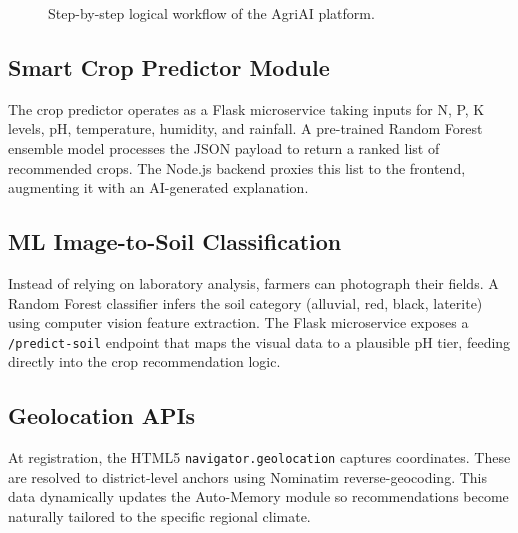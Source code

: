 \documentclass[conference]{IEEEtran}
\begin{document}
\begin{figure}[htbp]
\centering
{}
\caption{Step-by-step logical workflow of the AgriAI platform.}
\label{fig:arch}
\end{figure}

\subsection{Smart Crop Predictor Module}
The crop predictor operates as a Flask microservice taking inputs for N, P, K levels, pH, temperature, humidity, and rainfall. A pre-trained Random Forest ensemble model processes the JSON payload to return a ranked list of recommended crops. The Node.js backend proxies this list to the frontend, augmenting it with an AI-generated explanation.

\subsection{ML Image-to-Soil Classification}
Instead of relying on laboratory analysis, farmers can photograph their fields. A Random Forest classifier infers the soil category (alluvial, red, black, laterite) using computer vision feature extraction. The Flask microservice exposes a \texttt{/predict-soil} endpoint that maps the visual data to a plausible pH tier, feeding directly into the crop recommendation logic.

\subsection{Geolocation APIs}
At registration, the HTML5 \texttt{navigator.geolocation} captures coordinates. These are resolved to district-level anchors using Nominatim reverse-geocoding. This data dynamically updates the Auto-Memory module so recommendations become naturally tailored to the specific regional climate.
\end{document}
